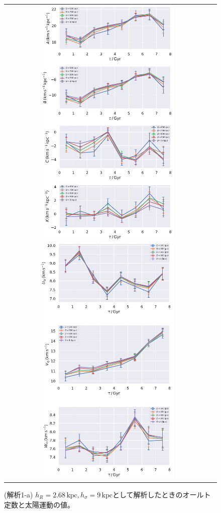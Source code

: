 \begin{figure}[htbp]
   \centering
\begin{tabular}{cc}
\includegraphics[width=7cm]{fig/ABCK_1a.pdf}
\includegraphics[width=7cm]{fig/UVW_1a.pdf}
\end{tabular}
    \caption{(解析1-a) $h_R=2.68\,\mathrm{kpc}, h_{\sigma}=9\,\mathrm{kpc}$として解析したときのオールト定数と太陽運動の値。}
    \label{figObs1a}
\end{figure}

